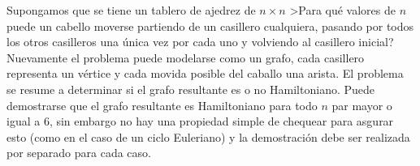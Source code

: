 \begin{ejemplo}
Supongamos que se tiene un tablero de ajedrez de $n\times n$
>Para qué valores de $n$ puede un cabello moverse partiendo de un casillero cualquiera, pasando por todos los otros casilleros una única vez por cada uno y volviendo al casillero inicial?
Nuevamente el problema puede modelarse como un grafo, cada casillero representa un vértice y cada movida posible del caballo una arista. 
El problema se resume a determinar si el grafo resultante es o no Hamiltoniano.
Puede demostrarse que el grafo resultante es Hamiltoniano para todo $n$ par mayor o igual a $6$, sin embargo no hay una propiedad simple de chequear para asgurar esto (como en el caso de un ciclo Euleriano) y la demostración debe ser realizada por separado para cada caso.
\end{ejemplo}